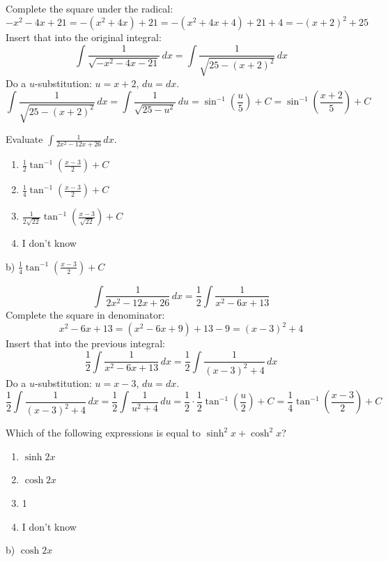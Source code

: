 \documentclass[addpoints,12pt,answers]{exam}
\begin{document}
\begin{questions}
\begin{solution}
    Complete the square under the radical:
    $$-x^2-4x+21=-(x^2+4x)+21=-(x^2+4x+4)+21+4=-(x+2)^2+25$$
    Insert that into the original integral:
    $$\int\frac{1}{\sqrt{-x^2-4x-21}}\,dx=\int\frac{1}{\sqrt{25-(x+2)^2}}\,dx$$
    Do a $u$-substitution: $u=x+2$, $du=dx$.
    $$\int\frac{1}{\sqrt{25-(x+2)^2}}\,dx=\int\frac{1}{\sqrt{25-u^2}}\,du=\sin^{-1}\left(\frac{u}{5}\right)+C=\sin^{-1}\left(\frac{x+2}{5}\right)+C$$
  \end{solution}
  \newpage
  \question
  Evaluate $\displaystyle\int\frac{1}{2x^2-12x+26}\,dx$.
  \begin{enumerate}[label=\alph*)]
    \item
    $\displaystyle\frac{1}{2}\tan^{-1}\left(\frac{x-3}{2}\right)+C$    
    \item
    $\displaystyle\frac{1}{4}\tan^{-1}\left(\frac{x-3}{2}\right)+C$
    \item
    $\displaystyle\frac{1}{2\sqrt{22}}\tan^{-1}\left(\frac{x-3}{\sqrt{22}}\right)+C$
    \item
    I don't know
  \end{enumerate}
  \begin{solution}
    b) $\displaystyle\frac{1}{4}\tan^{-1}\left(\frac{x-3}{2}\right)+C$
    
    $$\int\frac{1}{2x^2-12x+26}\,dx=\frac{1}{2}\int\frac{1}{x^2-6x+13}$$    
    Complete the square in denominator:
    $$x^2-6x+13=(x^2-6x+9)+13-9=(x-3)^2+4$$
    Insert that into the previous integral:
    $$\frac{1}{2}\int\frac{1}{x^2-6x+13}\,dx=\frac{1}{2}\int\frac{1}{(x-3)^2+4}\,dx$$
    Do a $u$-substitution: $u=x-3$, $du=dx$.
    $$\frac{1}{2}\int\frac{1}{(x-3)^2+4}\,dx=\frac{1}{2}\int\frac{1}{u^2+4}\,du=\frac{1}{2}\cdot\frac{1}{2}\tan^{-1}\left(\frac{u}{2}\right)+C=\frac{1}{4}\tan^{-1}\left(\frac{x-3}{2}\right)+C$$
  \end{solution}
  \newpage
  \question
  Which of the following expressions is equal to $\sinh^2 x+\cosh^2 x$?
  \begin{enumerate}[label=\alph*)]
    \item
    $\sinh 2x$
    \item
    $\cosh 2x$
    \item
    1
    \item
    I don't know
  \end{enumerate}
  \begin{solution}
    b) $\cosh 2x$
    

\end{solution}
\end{questions}
\end{document}
